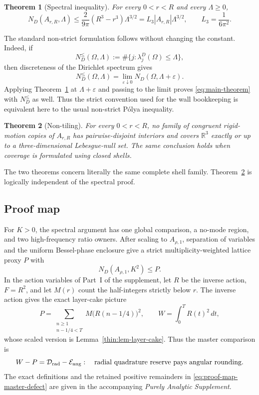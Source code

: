 \documentclass[11pt]{article}
\numberwithin{equation}{section}
\newtheorem{theorem}{Theorem}[section]
\theoremstyle{definition}
\theoremstyle{remark}
\newcommand{\R}{\mathbb R}
\begin{document}
\begin{theorem}[Spectral inequality]
\label{thm:spectral}
For every \(0<r<R\) and every \(\Lambda\ge0\),
\begin{equation}
  \boxed{
  N_D(A_{r,R},\Lambda)
  \le \frac{2}{9\pi}(R^3-r^3)\Lambda^{3/2}
  =L_3|A_{r,R}|\Lambda^{3/2},
  \qquad L_3=\frac1{6\pi^2}.}
  \label{eq:main-theorem}
\end{equation}
\end{theorem}

The standard non-strict formulation follows without changing the constant.
Indeed, if
\[
 N_D^{\leq}(\Omega,\Lambda)
 :=\#\{j:\lambda_j^D(\Omega)\leq\Lambda\},
\]
then discreteness of the Dirichlet spectrum gives
\begin{equation}
 N_D^{\leq}(\Omega,\Lambda)
 =\lim_{\varepsilon\downarrow0}
 N_D(\Omega,\Lambda+\varepsilon).
 \label{eq:strict-to-nonstrict}
\end{equation}
Applying Theorem~\ref{thm:spectral} at
\(\Lambda+\varepsilon\) and passing to the limit proves
\eqref{eq:main-theorem} with \(N_D^{\leq}\) as well.  Thus the strict
convention used for the wall bookkeeping is equivalent here to the usual
non-strict P\'olya inequality.

\begin{theorem}[Non-tiling]
\label{thm:nontiling}
For every \(0<r<R\), no family of congruent rigid-motion copies of
\(A_{r,R}\) has pairwise-disjoint interiors and covers \(\R^3\) exactly or
up to a three-dimensional Lebesgue-null set.  The same conclusion holds when
coverage is formulated using closed shells.
\end{theorem}

The two theorems concern literally the same complete shell family.
Theorem~\ref{thm:nontiling} is logically independent of the spectral proof.

\subsection*{Proof map}

For \(K>0\), the spectral argument has one global comparison, a no-mode
region, and two high-frequency ratio owners.  After scaling to
\(A_{\rho,1}\), separation of variables and the uniform Bessel-phase
enclosure give a strict multiplicity-weighted lattice proxy \(P\) with
\[
 N_D(A_{\rho,1},K^2)\leq P.
\]
In the action variables of Part~I of the supplement, let \(R\) be
the inverse action, \(F=R^2\), and let \(M(r)\) count the half-integers
strictly below \(r\).  The inverse action gives the exact layer-cake picture
\[
 P=\sum_{\substack{n\geq1\\n-1/4<T}}M\bigl(R(n-1/4)\bigr)^2,
 \qquad
 W=\int_0^T R(t)^2\,dt,
\]
whose scaled version is Lemma~\ref{thin:lem-layer-cake}.  Thus the master
comparison is
\begin{equation}
 W-P=\mathcal D_{\rm rad}-\mathcal E_{\rm ang}:
 \quad\hbox{radial quadrature reserve pays angular rounding.}
 \label{eq:proof-map-master-defect}
\end{equation}
The exact definitions and the retained positive remainders in
\eqref{eq:proof-map-master-defect} are given in the accompanying
\emph{Purely Analytic Supplement}.
\end{document}

